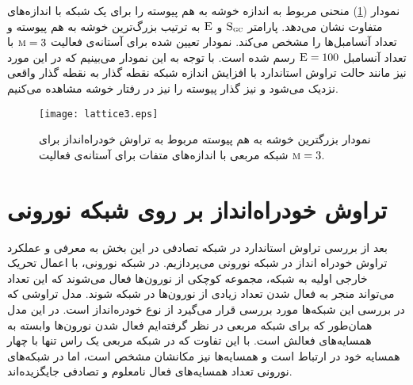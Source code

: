  نمودار (\ref{fig:lattice})  منحنی‌ مربوط به اندازه خوشه به هم پیوسته را برای یک شبکه با اندازه‌های متفاوت نشان می‌دهد. پارامتر 
  $\textsc{S}_{\textsc{gc}}$
   و
    $\textsc{E}$  به ترتیب بزرگ‌ترین خوشه به هم پیوسته و تعداد آنسامبل‌ها را مشخص می‌کند. نمودار تعیین شده برای آستانه‌ی فعالیت 
  $\textsc{m} = 3$
   با تعداد آنسامبل $\textsc{E}=100$ 
     رسم شده است. با توجه به این نمودار می‌بینیم که در این مورد نیز مانند حالت تراوش استاندارد با افزایش اندازه شبکه نقطه گذار به نقطه گذار واقعی نزدیک می‌شود و نیز گذار پیوسته را نیز در رفتار خوشه مشاهده می‌کنیم. 
 
 \begin{figure}[htbp]
 \hspace*{0cm}
 \centering
 \texttt{[image: lattice3.eps]}
 \caption[نمودار بزرگترین خوشه به هم پیوسته مربوط به تراوش  خودراه‌انداز برای شبکه مربعی] {\footnotesize  نمودار بزرگترین خوشه به هم پیوسته مربوط به تراوش  خودراه‌انداز برای شبکه مربعی با اندازه‌های متفات برای آستانه‌ی فعالیت  
 $\textsc{m}=3$.}
 \label{fig:lattice}
 \end{figure}
 


\section{تراوش خودراه‌انداز بر روی شبکه نورونی}
 بعد از بررسی تراوش استاندارد در شبکه تصادفی در این بخش به معرفی و عملکرد تراوش خودراه انداز در شبکه نورونی می‌پردازیم. 
 در شبکه نورونی، با اعمال تحریک خارجی اولیه به شبکه، مجموعه‌ کوچکی از نورون‌ها فعال می‌شوند که این تعداد می‌تواند منجر به فعال شدن تعداد زیادی از نورون‌ها در شبکه شوند. مدل تراوشی که در بررسی این شبکه‌ها مورد بررسی قرار می‌گیرد از نوع خودره‌انداز است. در این مدل همان‌طور که برای شبکه مربعی در نظر گرفته‌ایم فعال شدن نورون‌ها وابسته به همسایه‌های فعالش است. با این تفاوت که در شبکه مربعی یک راس تنها با چهار همسایه خود در ارتباط است و همسایه‌ها نیز مکانشان مشخص است، اما در شبکه‌های نورونی تعداد همسایه‌های فعال نامعلوم و تصادفی جایگزیده‌اند.
 

